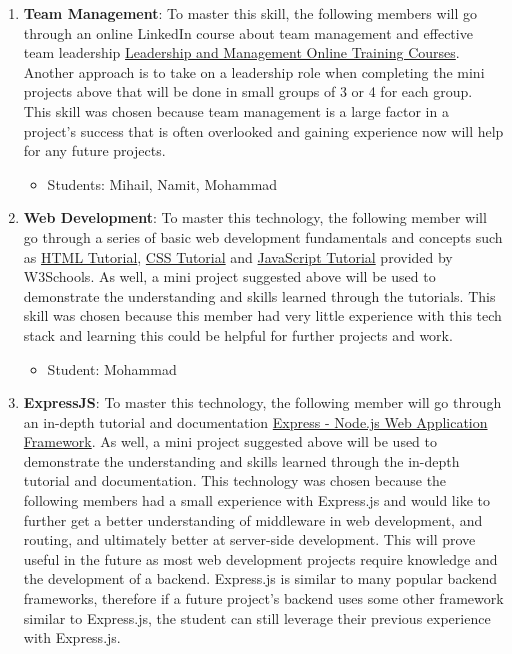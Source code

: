 \documentclass{article}
\begin{document}
\begin{enumerate}
    \item \textbf{Team Management}: To master this skill, the following members will go through an online LinkedIn course about team management and effective team leadership \href{https://www.linkedin.com/learning/topics/leadership-and-management}{Leadership and Management Online Training Courses}. Another approach is to take on a leadership role when completing the mini projects above that will be done in small groups of 3 or 4 for each group. This skill was chosen because team management is a large factor in a project's success that is often overlooked and gaining experience now will help for any future projects.
        \begin{itemize}
                \item Students: Mihail, Namit, Mohammad
            \end{itemize}
    \item \textbf{Web Development}: To master this technology, the following member will go through a series of basic web development fundamentals and concepts such as \href{https://www.w3schools.com/html/default.asp}{HTML Tutorial}, \href{https://www.w3schools.com/css/default.asp}{CSS Tutorial} and \href{https://www.w3schools.com/js/default.asp}{JavaScript Tutorial} provided by W3Schools. As well, a mini project suggested above will be used to demonstrate the understanding and skills learned through the tutorials. This skill was chosen because this member had very little experience with this tech stack and learning this could be helpful for further projects and work.
        \begin{itemize}
                \item Student: Mohammad 
            \end{itemize}
    \item \textbf{ExpressJS}: To master this technology, the following member will go through an in-depth tutorial and documentation \href{https://expressjs.com/}{Express - Node.js Web Application Framework}. As well, a mini project suggested above will be used to demonstrate the understanding and skills learned through the in-depth tutorial and documentation. This technology was chosen because the following members had a small experience with Express.js and would like to further get a better understanding of middleware in web development, and routing, and ultimately better at server-side development. This will prove useful in the future as most web development projects require knowledge and the development of a backend. Express.js is similar to many popular backend frameworks, therefore if a future project's backend uses some other framework similar to Express.js, the student can still leverage their previous experience with Express.js.

\end{enumerate}
\end{document}
